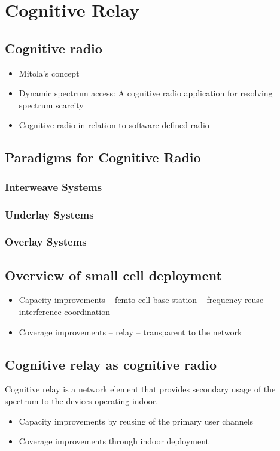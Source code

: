 \chapter{Cognitive Relay}
\label{chap:wav}

\section{Cognitive radio}
\begin{itemize}
\item Mitola's concept
\item Dynamic spectrum access: A cognitive radio application for resolving spectrum scarcity
\item Cognitive radio in relation to software defined radio
\end{itemize}

\section{Paradigms for Cognitive Radio}
\subsection{Interweave Systems}
\subsection{Underlay Systems}
\subsection{Overlay Systems}

\section{Overview of small cell deployment}
\begin{itemize}
\item Capacity improvements -- femto cell base station -- frequency reuse -- interference coordination 
\item Coverage improvements -- relay -- transparent to the network
\end{itemize}

\section{Cognitive relay as cognitive radio}
Cognitive relay is a network element that provides secondary usage of the spectrum to the devices operating indoor.
\begin{itemize}
\item Capacity improvements by reusing of the primary user channels 
\item Coverage improvements through indoor deployment
\end{itemize}


